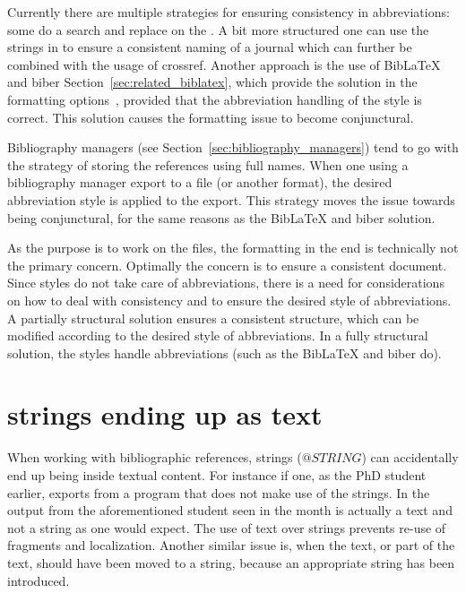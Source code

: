 Currently there are multiple strategies for ensuring consistency in
abbreviations: some do a search and replace on the .  A bit
more structured one can use the strings in {\bibtex} to ensure a
consistent naming of a journal which can further be combined with the
usage of crossref.  Another approach is the use of Bib{\LaTeX} and
biber Section~\ref{sec:related_biblatex}, which provide the solution
in the formatting options~\cite{koppensteiner2011abbreviate}, provided
that the abbreviation handling of the style is correct.  This solution
causes the formatting issue to become conjunctural.

Bibliography managers (see Section~\ref{sec:bibliography_managers})
tend to go with the strategy of storing the references using full
names.  When one using a bibliography manager export to a {\bibtex}
file (or another format), the desired abbreviation style is applied to
the export.  This strategy moves the issue towards being conjunctural,
for the same reasons as the Bib{\LaTeX} and biber solution.

As the purpose is to work on the {\bibtex} files, the formatting in
the end is technically not the primary concern.  Optimally the concern
is to ensure a consistent document.  Since {\bibtex} styles do not
take care of abbreviations, there is a need for considerations on how
to deal with consistency and to ensure the desired style of
abbreviations.  A partially structural solution ensures a consistent
structure, which can be modified according to the desired style of
abbreviations.  In a fully structural solution, the styles handle
abbreviations (such as the Bib{\LaTeX} and biber do).


\section{{\bibtex} strings ending up as text}
\label{sec:problems_strings_as_text}

When working with bibliographic references, {\bibtex} strings
($@STRING$) can accidentally end up being inside textual content.  For
instance if one, as the PhD student earlier, exports from a program
that does not make use of the strings.  In the output from the
aforementioned student seen in  the month
is actually a text and not a string as one would expect.  The use of
text over strings prevents re-use of fragments and localization.
Another similar issue is, when the text, or part of the text, should
have been moved to a string, because an appropriate string has been
introduced.


